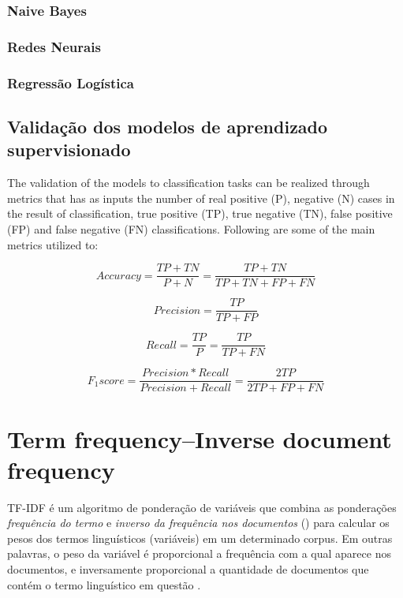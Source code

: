 \documentclass[
	12pt,				%
	oneside,			%
	a4paper,			%
	english,			%
	brazil				%
	]{abntex2ppgsi}
\begin{document}
\subsubsection{Naive Bayes}
\subsubsection{Redes Neurais}
\subsubsection{Regressão Logística}



\subsection{Validação dos modelos de aprendizado supervisionado}
\label{modelValidation}

The validation of the models to classification tasks can be realized through metrics that has as inputs the number of real positive (P), negative (N) cases in the result of classification, true positive (TP), true negative (TN), false positive (FP) and false negative (FN) classifications. Following are some of the main metrics utilized to:

\begin{equation}
Accuracy = \frac{TP + TN}{P + N} = \frac{TP + TN}{TP + TN + FP + FN}
\end{equation}

\begin{equation}
Precision = \frac{TP}{TP + FP}
\end{equation}

\begin{equation}
Recall = \frac{TP}{P} = \frac{TP}{TP + FN}
\end{equation}

\begin{equation}
F_1 score = \frac{Precision * Recall}{Precision + Recall} = \frac{2TP}{2TP + FP + FN}
\end{equation}

\section{Term frequency–Inverse document frequency}

TF-IDF é um algoritmo de ponderação de variáveis que combina as ponderações \emph{frequência do termo}  e \emph{inverso da frequência nos documentos} () para calcular os pesos dos termos linguísticos (variáveis) em um determinado corpus. Em outras palavras, o peso da variável é proporcional a frequência com a qual aparece nos documentos, e inversamente proporcional a quantidade de documentos que contém o termo linguístico em questão \cite{wu2018improved, yahav2018comments}. 
\end{document}
